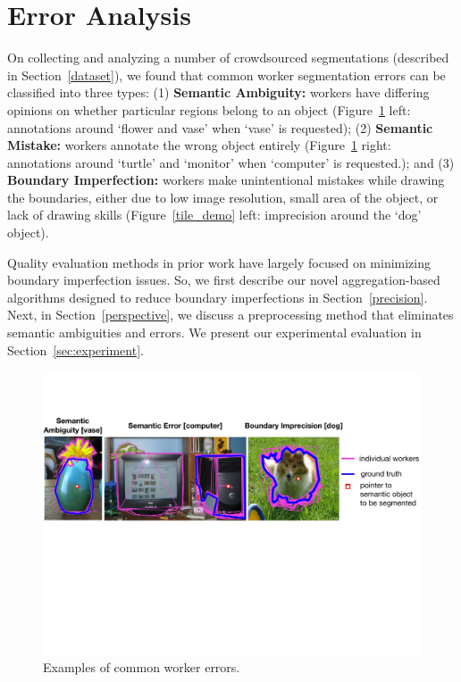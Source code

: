 \documentclass[letterpaper]{article}
\begin{document}
\section{Error Analysis\label{sec:error}}
\par On collecting and analyzing a number of crowdsourced segmentations (described in Section~\ref{dataset}), we found that common worker segmentation errors can be classified into three types: (1) \textbf{Semantic Ambiguity:} workers have differing opinions on whether particular regions belong to an object (Figure~\ref{error_examples} left: annotations around `flower and vase' when `vase' is requested); (2) \textbf{Semantic Mistake:} workers annotate the wrong object entirely (Figure~\ref{error_examples} right: annotations around `turtle' and `monitor' when `computer' is requested.); and (3) \textbf{Boundary Imperfection:} workers make unintentional mistakes while drawing the boundaries, either due to low image resolution, small area of the object, or lack of drawing skills (Figure~\ref{tile_demo} left: imprecision around the `dog' object).
\par Quality evaluation methods in prior work have largely focused on minimizing boundary imperfection issues. So, we first describe our novel aggregation-based algorithms designed to reduce boundary imperfections in Section~\ref{precision}. Next, in Section~\ref{perspective}, we discuss a preprocessing method that eliminates semantic ambiguities and errors.
We present our experimental evaluation in Section~\ref{sec:experiment}.
\begin{figure}[h!]
    \centering
    \includegraphics[width=\linewidth]{plots/errors.pdf}
    \caption{Examples of common worker errors.}
    \label{error_examples}
\end{figure}
\end{document}
